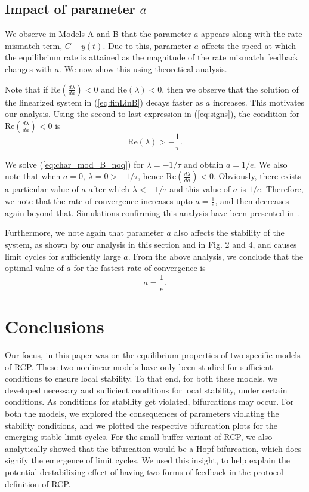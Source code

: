 \documentclass[conference]{IEEEtran}
\begin{document}
\subsection{Impact of parameter $a$}
We observe in Models A and B that the parameter $a$ appears along with the rate mismatch term, 
$C - y\left(t\right)$. Due to this, parameter $a$ affects the speed at which 
the equilibrium rate is attained as the magnitude of the rate mismatch feedback changes with 
$a$. We now show this using theoretical analysis.

Note that if $\text{Re}\left(\frac{d\lambda}{da}\right) < 0$ and $\text{Re}\left(\lambda\right) < 0$, 
then we observe that the solution of the linearized system in (\ref{eq:finLinB}) decays faster as $a$ increases. This motivates our analysis. Using the second to last expression in (\ref{eq:signs}), the condition for $\text{Re}\left(\frac{d\lambda}{da}\right) < 0$ is
\begin{equation}
\text{Re}\left(\lambda\right) > -\frac{1}{\tau}.
\end{equation}

We solve (\ref{eq:char_mod_B_noq}) for $\lambda = -1/\tau$ and obtain $a = 1/e$. We also note that when 
$a = 0$, $\lambda = 0 > -1/\tau$, hence 
$\text{Re}\left(\frac{d\lambda}{da}\right) < 0$. Obviously, there exists a particular value of $a$ after which 
$\lambda < -1/\tau$ and this value of $a$ is $1/e$. Therefore, we note that the rate of 
convergence increases upto $a = \frac{1}{e}$, and then decreases again beyond that. Simulations confirming this analysis have been presented in 
\cite{NanditaPhD}.

Furthermore, we note again that parameter $a$ also affects the stability of the system, as shown by our analysis in this section and in Fig. 2 and 4, and causes limit cycles for sufficiently large $a$. From the above analysis, we conclude that the optimal value of $a$ for the fastest rate of convergence is
\begin{equation}
a = \frac{1}{e}.
\end{equation}

\section{Conclusions}                  

Our focus, in this paper was on the equilibrium properties of two specific models of RCP. These two nonlinear models have only been studied for sufficient conditions to ensure local stability. To that end, for both these models, we developed necessary and sufficient conditions for local stability, under certain conditions. As conditions for stability get violated, bifurcations may occur. For both the models, we explored the consequences of parameters violating the stability conditions, and we plotted the respective bifurcation plots for the emerging stable limit cycles. For the small buffer variant of RCP, we also analytically showed that the bifurcation would be a Hopf bifurcation, which does signify the emergence of limit cycles. We used this insight, to help explain the potential destabilizing effect of having two forms of feedback in the protocol definition of RCP.    
\end{document}
